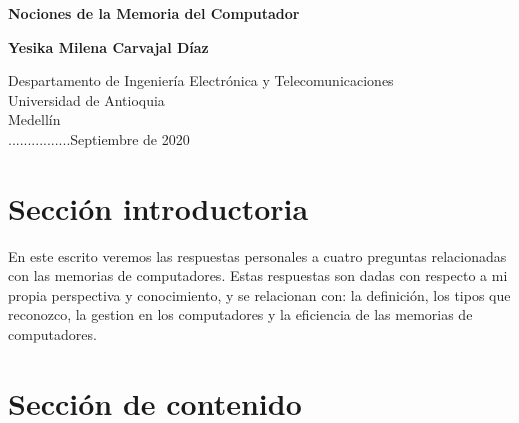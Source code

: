 \documentclass{article}
\begin{document}
\begin{titlepage}
    \begin{center}
        \vspace*{1cm}
            
        \Huge
        \textbf{Nociones de la Memoria del Computador}
            
        \vspace{0.5cm}
        \LARGE
            
        \vspace{1.5cm}
            
        \textbf{Yesika Milena Carvajal Díaz}
            
        \vfill
            
        \vspace{0.8cm}
            
        \Large
        Despartamento de Ingeniería Electrónica y Telecomunicaciones\\
        Universidad de Antioquia\\
        Medellín\\
        ................Septiembre de 2020
            
    \end{center}
\end{titlepage}

\tableofcontents

\section{Sección introductoria}

En este escrito veremos las respuestas personales a cuatro preguntas relacionadas con las memorias de computadores. Estas respuestas son dadas con respecto a mi propia perspectiva y conocimiento, y se relacionan con: la definición, los tipos que reconozco, la gestion en los computadores y la eficiencia de las memorias de computadores.


\section{Sección de contenido} \label{contenido}
\end{document}
